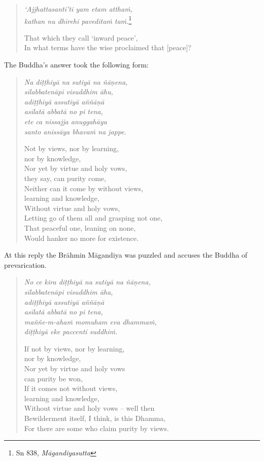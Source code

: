 \begin{quote}
\emph{`Ajjhattasantī'ti yam etam atthaṁ,}\\
\emph{kathan nu dhīrehi paveditaṁ taṁ.}\footnote{Sn 838, \emph{Māgandiyasutta}}

That which they call `inward peace',\\
In what terms have the wise proclaimed that {[}peace{]}?
\end{quote}

\clearpage

The Buddha's answer took the following form:

\begin{quote}
\emph{Na diṭṭhiyā na sutiyā na ñāṇena,}\\
\emph{sīlabbatenāpi visuddhim āhu,}\\
\emph{adiṭṭhiyā assutiyā aññāṇā}\\
\emph{asīlatā abbatā no pi tena,}\\
\emph{ete ca nissajja anuggahāya}\\
\emph{santo anissāya bhavaṁ na jappe.}

Not by views, nor by learning,\\
\vin nor by knowledge,\\
Nor yet by virtue and holy vows,\\
\vin they say, can purity come,\\
Neither can it come by without views,\\
\vin learning and knowledge,\\
Without virtue and holy vows,\\
Letting go of them all and grasping not one,\\
That peaceful one, leaning on none,\\
Would hanker no more for existence.
\end{quote}

At this reply the Brāhmin Māgandiya was puzzled and accuses the Buddha of prevarication.

\begin{quote}
\emph{No ce kira diṭṭhiyā na sutiyā na ñāṇena,}\\
\emph{sīlabbatenāpi visuddhim āha,}\\
\emph{adiṭṭhiyā assutiyā aññāṇā}\\
\emph{asīlatā abbatā no pi tena,}\\
\emph{maññe-m-ahaṁ momuham eva dhammaṁ,}\\
\emph{diṭṭhiyā eke paccenti suddhiṁ.}

If not by views, nor by learning,\\
\vin nor by knowledge,\\
Nor yet by virtue and holy vows\\
\vin can purity be won,\\
If it comes not without views,\\
\vin learning and knowledge,\\
Without virtue and holy vows -- well then\\
Bewilderment itself, I think, is this Dhamma,\\
For there are some who claim purity by views.
\end{quote}

